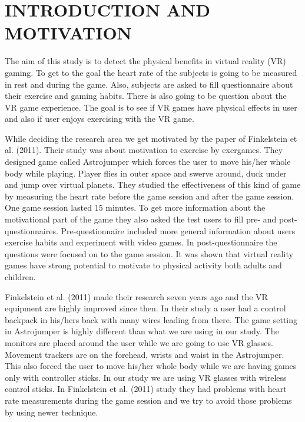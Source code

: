 \documentclass{sig-alternate-05-2015}
\begin{document}


%
%

%
%
\printccsdesc



\section{INTRODUCTION AND MOTIVATION}
The aim of this study is to detect the physical benefits in virtual reality 
(VR) gaming. To get to the goal the heart rate of the subjects is going to 
be measured in rest and during the game. Also, subjects are asked to fill 
questionnaire about their exercise and gaming habits. There is also going 
to be question about the VR game experience. The goal is to see if VR games 
have physical effects in user and also if user enjoys exercising with the 
VR game.

While deciding the research area we get motivated by the paper of Finkelstein 
et al. (2011). \cite{finkelstein2011astrojumper} Their study was about 
motivation to exercise by exergames. 
They designed game called Astrojumper which forces the user to move his/her 
whole body while playing. Player flies in outer space and swerve around, 
duck under and jump over virtual planets. They studied the effectiveness 
of this kind of game by measuring the heart rate before the game session 
and after the game session. One game session lasted 15 minutes. To get 
more information about the motivational part of the game they also asked 
the test users to fill pre- and post-questionnaires. Pre-questionnaire 
included more general information about users exercise habits and experiment 
with video games. In post-questionnaire the questions were focused on to 
the game session. It was shown that virtual reality games have strong 
potential to motivate to physical activity both adults and children.

Finkelstein et al. (2011) made their research seven years ago and the VR 
equipment are highly improved since then. In their study a user had a 
control backpack in his/hers back with many wires leading from there. 
The game setting in Astrojumper is highly different than what we are using 
in our study. The monitors are placed around the user while we are going 
to use VR glasses. Movement trackers are on the forehead, wrists and waist 
in the Astrojumper. This also forced the user to move his/her whole body 
while we are having games only with controller sticks. In our study we 
are using VR glasses with wireless control sticks. In Finkelstein et al. 
(2011) study they had problems with heart rate measurements during the game 
session and we try to avoid those problems by using newer technique. 
\end{document}

